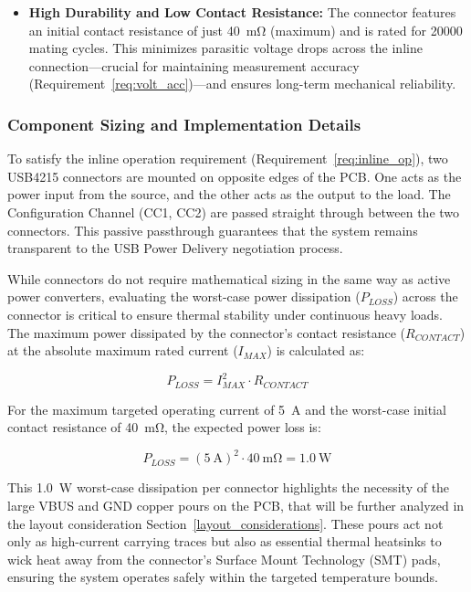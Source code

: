 \begin{itemize}
    \item \textbf{High Durability and Low Contact Resistance:} 
    The connector features an initial contact resistance of just \SI{40}{\milli\ohm} (maximum) and is rated for \num{20000} mating cycles. This minimizes parasitic voltage drops across the inline connection—crucial for maintaining measurement accuracy (Requirement~\ref{req:volt_acc})—and ensures long-term mechanical reliability.

    

\end{itemize}

\subsubsection{Component Sizing and Implementation Details}
To satisfy the inline operation requirement (Requirement~\ref{req:inline_op}), two USB4215 connectors are mounted on opposite edges of the PCB. One acts as the power input from the source, and the other acts as the output to the load. The Configuration Channel (CC1, CC2) are passed straight through between the two connectors. This passive passthrough guarantees that the system remains transparent to the USB Power Delivery negotiation process.

While connectors do not require mathematical sizing in the same way as active power converters, evaluating the worst-case power dissipation ($P_{LOSS}$) across the connector is critical to ensure thermal stability under continuous heavy loads. The maximum power dissipated by the connector's contact resistance ($R_{CONTACT}$) at the absolute maximum rated current ($I_{MAX}$) is calculated as:

$$P_{LOSS} = I_{MAX}^2 \cdot R_{CONTACT}$$

For the maximum targeted operating current of \SI{5}{\ampere} and the worst-case initial contact resistance of \SI{40}{\milli\ohm}, the expected power loss is:

$$P_{LOSS} = (\SI{5}{\ampere})^2 \cdot \SI{40}{\milli\ohm} = \SI{1.0}{\watt}$$

This \SI{1.0}{\watt} worst-case dissipation per connector highlights the necessity of the large VBUS and GND copper pours on the PCB, that will be further analyzed in the layout consideration Section~\ref{layout_considerations}. These pours act not only as high-current carrying traces but also as essential thermal heatsinks to wick heat away from the connector's Surface Mount Technology (SMT) pads, ensuring the system operates safely within the targeted temperature bounds.


